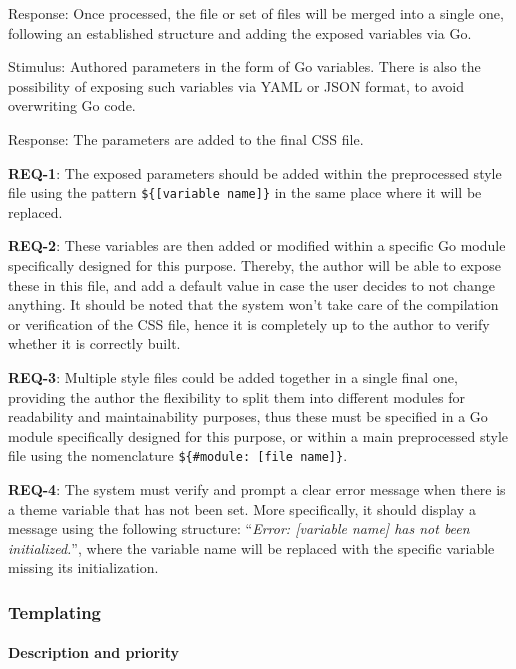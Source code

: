 Response: Once processed, the file or set of files will be merged into a
single one, following an established structure and adding the exposed
variables via Go.

Stimulus: Authored parameters in the form of Go variables. There is also
the possibility of exposing such variables via YAML\cite{wikiyaml} or JSON\cite{wikijson} format, to
avoid overwriting Go code.

Response: The parameters are added to the final CSS file.

\textbf{REQ-1}: The exposed parameters should be added within the
preprocessed style file using the pattern
\texttt{\$\{{[}variable\ name{]}\}} in the same place where it will be
replaced.

\textbf{REQ-2}: These variables are then added or modified within a
specific Go module specifically designed for this purpose. Thereby, the
author will be able to expose these in this file, and add a default
value in case the user decides to not change anything. It should be
noted that the system won't take care of the compilation or verification
of the CSS file, hence it is completely up to the author to verify
whether it is correctly built.

\textbf{REQ-3}: Multiple style files could be added together in a single
final one, providing the author the flexibility to split them into
different modules for readability and maintainability purposes, thus
these must be specified in a Go module specifically designed for this
purpose, or within a main preprocessed style file using the nomenclature
\texttt{\$\{\#module:\ {[}file\ name{]}\}}.

\textbf{REQ-4}: The system must verify and prompt a clear error message
when there is a theme variable that has not been set. More specifically,
it should display a message using the following structure:
``\emph{Error: {[}variable name{]} has not been initialized.}'', where
the variable name will be replaced with the specific variable missing
its initialization.

\subsubsection{Templating}\label{subsubsec:templating}

\paragraph{Description and
priority}\label{par:description-and-priority-2}

